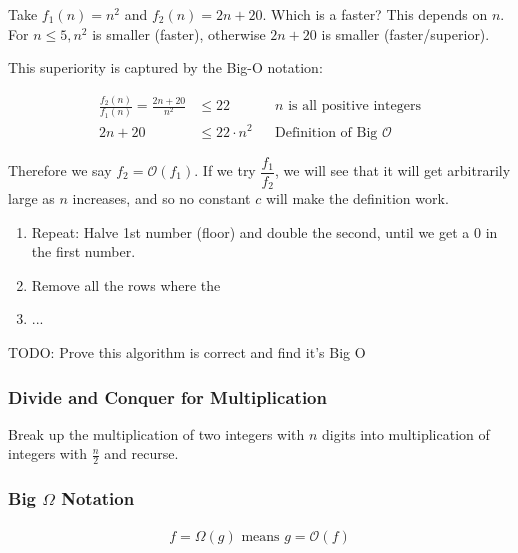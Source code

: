 \documentclass[12pt]{article}
\renewcommand{\O}{\mathcal{O}}
\begin{document}
\begin{example}
    Take $f_1(n) = n^2$ and $f_2(n) = 2n + 20$. Which is a faster? This depends on $n$. For $n \le 5, n^2$ is smaller (faster), otherwise $2n + 20$ is smaller (faster/superior).

    This superiority is captured by the Big-O notation:

    \begin{align*}
        \frac{f_2(n)}{f_1(n)} = \frac{2n + 20}{n^2} & \le 22           &  & \text{$n$ is all positive integers} \\
        2n + 20                                     & \le 22 \cdot n^2 &  & \text{Definition of Big $\O$}
    \end{align*}

    Therefore we say $f_2 = \O(f_1)$. If we try $\dfrac{f_1}{f_2}$, we will see that it will get arbitrarily large as $n$ increases, and so no constant $c$ will make the definition work.
\end{example}


\begin{example}
    \begin{enumerate}
        \item Repeat: Halve 1st number (floor) and double the second, until we get a 0 in the first number.
        \item Remove all the rows where the
        \item ...
    \end{enumerate}

    {\color{red} TODO: Prove this algorithm is correct and find it's Big O}
\end{example}

\subsubsection{Divide and Conquer for Multiplication}
Break up the multiplication of two integers with $n$ digits into multiplication of integers with $\frac{n}{2}$ and recurse.





\subsubsection{Big \texorpdfstring{$\Omega$}{Omega} Notation}
\begin{align*}
    f = \Omega(g) \text{ means } g = \O(f) \\
\end{align*}
\end{document}
